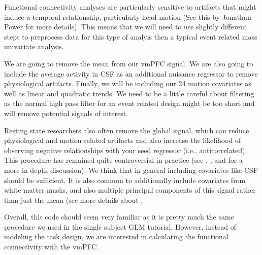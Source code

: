 \documentclass[letterpaper,10pt,english]{sphinxmanual}
\begin{document}
Functional connectivity analyses are particularly sensitive to artifacts that might induce a temporal relationship, particularly head motion (See this  by Jonathan Power for more details). This means that we will need to use slightly different steps to preprocess data for this type of analyis then a typical event related mass univariate analysis.

We are going to remove the mean from our vmPFC signal. We are also going to include the average activity in CSF as an additional nuisance regressor to remove physiological artifacts. Finally, we will be including our 24 motion covariates as well as linear and quadratic trends. We need to be a little careful about filtering as the normal high pass filter for an event related design might be too short and will remove potential signals of interest.

Resting state researchers also often remove the global signal, which can reduce physiological and motion related artifacts and also increase the likelihood of observing negative relationships with your seed regressor (i.e., anticorrelated). This procedure has remained quite controversial in practice (see  , , and  for a more in depth discussion). We think that in general including covariates like CSF should be sufficient. It is also common to additionally include covariates from white matter masks, and also multiple principal components of this signal rather than just the mean (see more details about .

Overall, this code should seem very familiar as it is pretty much the same procedure we used in the single subject GLM tutorial. However, instead of modeling the task design, we are interested in calculating the functional connectivity with the vmPFC.
\end{document}
